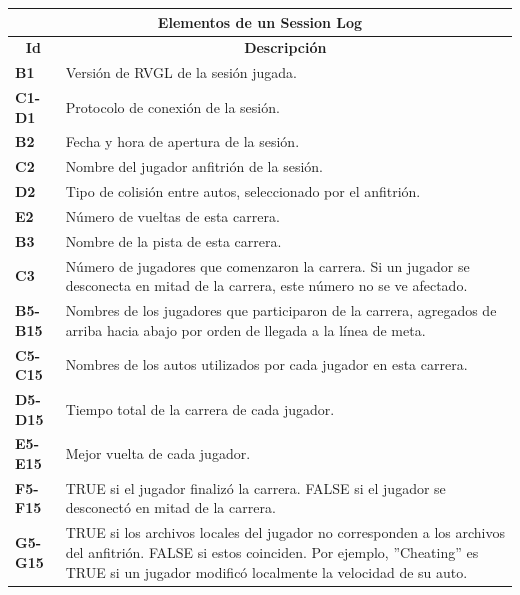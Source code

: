 \begin{center}
	\begin{tabular}{ | l | p{15cm} |}
		\hline
		\multicolumn{2}{|c|}{\textbf{Elementos de un Session Log}} \\
		\hline
		\multicolumn{1}{|c|}{\textbf{Id}} & \multicolumn{1}{|c|}{\textbf{Descripción}} \\
		\hline
		{\textbf{B1}} & Versión de RVGL de la sesión jugada. \\ \hline
		
		{\textbf{C1-D1}} & Protocolo de conexión de la sesión. \\ \hline
		
		{\textbf{B2}} & Fecha y hora de apertura de la sesión. \\ \hline
		
		{\textbf{C2}} & Nombre del jugador anfitrión de la sesión. \\ \hline
		
		{\textbf{D2}} & Tipo de colisión entre autos, seleccionado por el anfitrión. \\ \hline
		
		{\textbf{E2}} & Número de vueltas de esta carrera. \\ \hline
		
		{\textbf{B3}} & Nombre de la pista de esta carrera. \\ \hline
		
		{\textbf{C3}} & Número de jugadores que comenzaron la carrera. Si un jugador se desconecta en mitad de la carrera, este número no se ve afectado. \\ \hline
		
		{\textbf{B5-B15}} & Nombres de los jugadores que participaron de la carrera, agregados de arriba hacia abajo por orden de llegada a la línea de meta. \\ \hline
		
		{\textbf{C5-C15}} & Nombres de los autos utilizados por cada jugador en esta carrera. \\ \hline
		
		{\textbf{D5-D15}} & Tiempo total de la carrera de cada jugador.\\ \hline
		
		{\textbf{E5-E15}} & Mejor vuelta de cada jugador.\\ \hline
		
		{\textbf{F5-F15}} & TRUE si el jugador finalizó la carrera. FALSE si el jugador se desconectó en mitad de la carrera.\\ \hline
		
		{\textbf{G5-G15}} & TRUE si los archivos locales del jugador no corresponden a los archivos del anfitrión. FALSE si estos coinciden. Por ejemplo, ''Cheating'' es TRUE si un jugador modificó localmente la velocidad de su auto.\\ \hline
	\end{tabular}
\end{center}

